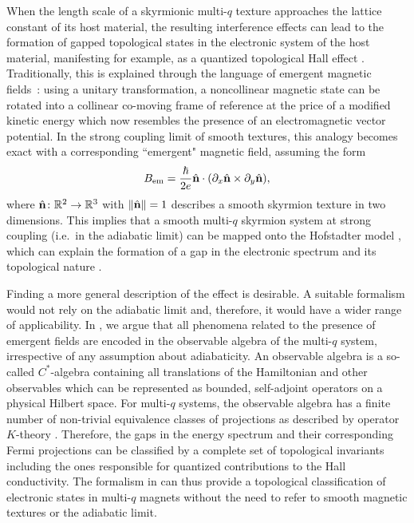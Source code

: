 \documentclass[submission, Phys]{SciPost}
\begin{document}
When the length scale of a skyrmionic multi-$q$ texture approaches the lattice constant of its host material, the resulting interference effects can lead to the formation of gapped topological states in the electronic system of the host material, manifesting for example, as a quantized topological Hall effect \cite{Hamamoto2015}.
Traditionally, this is explained through the language of emergent magnetic fields~\cite{Bruno2004, Fujita2011, Everschor2014}: using a unitary transformation, a noncollinear magnetic state can be rotated into a collinear co-moving frame of reference at the price of a modified kinetic energy which now resembles the presence of an electromagnetic vector potential. 
In the strong coupling limit of smooth textures, this analogy becomes exact with a corresponding ``emergent" magnetic field, assuming the form 
\begin{align}
    B_{\mathrm{em}} = \frac{\hbar}{2e} 
    \hat{\mathbf{n}} \cdot (\partial_x \hat{\mathbf{n}} \times \partial_y \hat{\mathbf{n}}),
\end{align}
where $\hat{\mathbf{n}} \colon \mathbb{R}^2\to \mathbb{R}^3$ with $\| \hat{\mathbf{n}} \| = 1$ describes a smooth skyrmion texture in two dimensions.
This implies that a smooth multi-$q$ skyrmion system at strong coupling (i.e.~in the adiabatic limit) can be mapped onto the Hofstadter model \cite{Hofstadter1976},
which can explain the formation of a gap in the electronic spectrum and its topological nature \cite{Hamamoto2015, Thouless1982}.

Finding a more general description of the effect is desirable. 
A suitable formalism would not rely on the adiabatic limit and, therefore, it would have a wider range of applicability.
In \cite{Lux2024}, we argue that all phenomena related to the presence of emergent fields are encoded in the observable algebra of the multi-$q$ system, irrespective of any assumption about adiabaticity.
An observable algebra is a so-called $C^\ast$-algebra \cite{Murphy1990} containing all translations of the Hamiltonian and other observables which can be represented as bounded, self-adjoint operators on a physical Hilbert space.
For multi-$q$ systems, the observable algebra has a finite number of non-trivial equivalence classes of projections as described by operator $K$-theory \cite{Rordam2000}. 
Therefore, the gaps in the energy spectrum and their corresponding Fermi projections can be classified by a complete set of topological invariants including the ones responsible for quantized contributions to the Hall conductivity.
The formalism in \cite{Lux2024} can thus provide a topological classification of electronic states in multi-$q$ magnets without the need to refer to smooth magnetic textures or the adiabatic limit.
\end{document}
